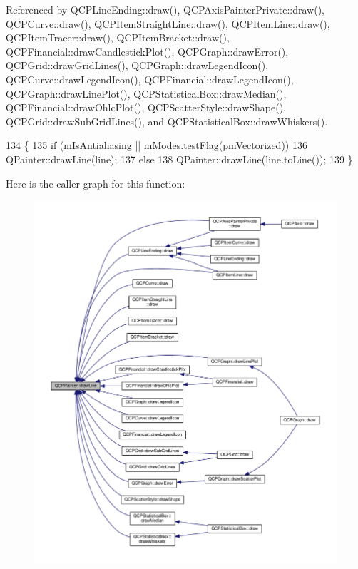 Referenced by Q\+C\+P\+Line\+Ending\+::draw(), Q\+C\+P\+Axis\+Painter\+Private\+::draw(), Q\+C\+P\+Curve\+::draw(), Q\+C\+P\+Item\+Straight\+Line\+::draw(), Q\+C\+P\+Item\+Line\+::draw(), Q\+C\+P\+Item\+Tracer\+::draw(), Q\+C\+P\+Item\+Bracket\+::draw(), Q\+C\+P\+Financial\+::draw\+Candlestick\+Plot(), Q\+C\+P\+Graph\+::draw\+Error(), Q\+C\+P\+Grid\+::draw\+Grid\+Lines(), Q\+C\+P\+Graph\+::draw\+Legend\+Icon(), Q\+C\+P\+Curve\+::draw\+Legend\+Icon(), Q\+C\+P\+Financial\+::draw\+Legend\+Icon(), Q\+C\+P\+Graph\+::draw\+Line\+Plot(), Q\+C\+P\+Statistical\+Box\+::draw\+Median(), Q\+C\+P\+Financial\+::draw\+Ohlc\+Plot(), Q\+C\+P\+Scatter\+Style\+::draw\+Shape(), Q\+C\+P\+Grid\+::draw\+Sub\+Grid\+Lines(), and Q\+C\+P\+Statistical\+Box\+::draw\+Whiskers().


\begin{DoxyCode}
134                                             \{
135   \textcolor{keywordflow}{if} (\hyperlink{class_q_c_p_painter_a7055085da176aee0f6b23298f1003d08}{mIsAntialiasing} || \hyperlink{class_q_c_p_painter_af5d1d6e5df0adbc7de5633250fb3396c}{mModes}.testFlag(\hyperlink{class_q_c_p_painter_a156cf16444ff5e0d81a73c615fdb156daeda679cd55dcd468341d07d48a30b6ab}{pmVectorized}))
136     QPainter::drawLine(line);
137   \textcolor{keywordflow}{else}
138     QPainter::drawLine(line.toLine());
139 \}
\end{DoxyCode}


Here is the caller graph for this function\+:\nopagebreak
\begin{figure}[H]
\begin{center}
\leavevmode
\includegraphics[width=350pt]{class_q_c_p_painter_a0b4b1b9bd495e182c731774dc800e6e0_icgraph}
\end{center}
\end{figure}



